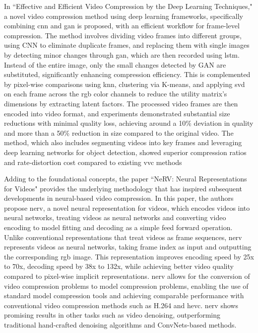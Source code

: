 \documentclass{ioereport}
\begin{document}
In ``Effective and Efficient Video Compression by the Deep Learning Techniques," \cite{paneerselvam_effective} a novel video compression method using deep learning frameworks, specifically combining \gls{cnn} and \gls{gan} is proposed, with an efficient workflow for frame-level compression. The method involves dividing video frames into different groups, using CNN to eliminate duplicate frames, and replacing them with single images by detecting minor changes through \gls{gan}, which are then recorded using \gls{lstm}. Instead of the entire image, only the small changes detected by GAN are substituted, significantly enhancing compression efficiency. This is complemented by pixel-wise comparisons using \gls{knn}, clustering via K-means, and applying \gls{svd} on each frame across the \gls{rgb} color channels to reduce the utility matrix's dimensions by extracting latent factors. The processed video frames are then encoded into video format, and experiments demonstrated substantial size reductions with minimal quality loss, achieving around a 10\% deviation in quality and more than a 50\% reduction in size compared to the original video. The method, which also includes segmenting videos into key frames and leveraging deep learning networks for object detection, showed superior compression ratios and rate-distortion cost compared to existing \gls{vvc} methods

Adding to the foundational concepts, the paper ``NeRV: Neural Representations for Videos" \cite{chen2021nerv} provides the underlying methodology that has inspired subsequent developments in neural-based video compression. In this paper, the authors propose \gls{nerv}, a novel neural representation for videos, which encodes videos into neural networks, treating videos as neural networks and converting video encoding to model fitting and decoding as a simple feed forward operation. Unlike conventional representations that treat videos as frame sequences, \gls{nerv} represents videos as neural networks, taking frame index as input and outputting the corresponding \gls{rgb} image. This representation improves encoding speed by 25x to 70x, decoding speed by 38x to 132x, while achieving better video quality compared to pixel-wise implicit representations. \gls{nerv} allows for the conversion of video compression problems to model compression problems, enabling the use of standard model compression tools and achieving comparable performance with conventional video compression methods such as H.264 and \gls{hevc}. \gls{nerv} shows promising results in other tasks such as video denoising, outperforming traditional hand-crafted denoising algorithms and ConvNets-based methods.
\end{document}
